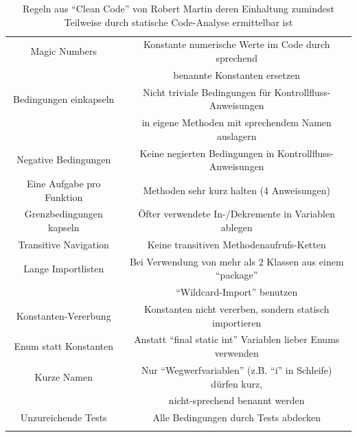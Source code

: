 \documentclass[da,ngerman]{stthesis}
\begin{document}
\begin{center}
\begin{longtabu}{|c|c|}
  						\hline
  						Magic Numbers & Konstante numerische Werte im Code durch sprechend \\ & benannte Konstanten ersetzen \\
  						\hline
  						Bedingungen einkapseln & Nicht triviale Bedingungen für Kontrollfluss-Anweisungen \\ & in eigene Methoden mit sprechendem Namen auslagern \\  
  						\hline
  						Negative Bedingungen & Keine negierten Bedingungen in Kontrollfluss-Anweisungen \\
  						\hline
  						Eine Aufgabe pro Funktion & Methoden sehr kurz halten (4 Anweisungen) \\
  						\hline
  						Grenzbedingungen kapseln & Öfter verwendete In-/Dekremente in Variablen ablegen \\
  						\hline
  						Transitive Navigation & Keine transitiven Methodenaufrufs-Ketten \\
  						\hline
  						Lange Importlisten & Bei Verwendung von mehr als 2 Klassen aus einem "`package"' \\ & "`Wildcard-Import"' benutzen \\
  						\hline
  						Konstanten-Vererbung & Konstanten nicht vererben, sondern statisch importieren \\
  						\hline
  						Enum statt Konstanten & Anstatt "`final static int"' Variablen lieber Enums verwenden \\
  						\hline
  						Kurze Namen & Nur "`Wegwerfvariablen"' (z.B. "`i"' in Schleife) dürfen kurz, \\ & nicht-sprechend benannt werden \\
  						\hline  
  						Unzureichende Tests & Alle Bedingungen durch Tests abdecken \\
  						\hline   
  						\caption{Regeln aus "`Clean Code"' von Robert Martin deren Einhaltung zumindest Teilweise durch statische Code-Analyse ermittelbar ist \cite{CleanCode}}
						\label{cleancoderules}
  					\end{longtabu}   
  				\end{center}
\end{document}
